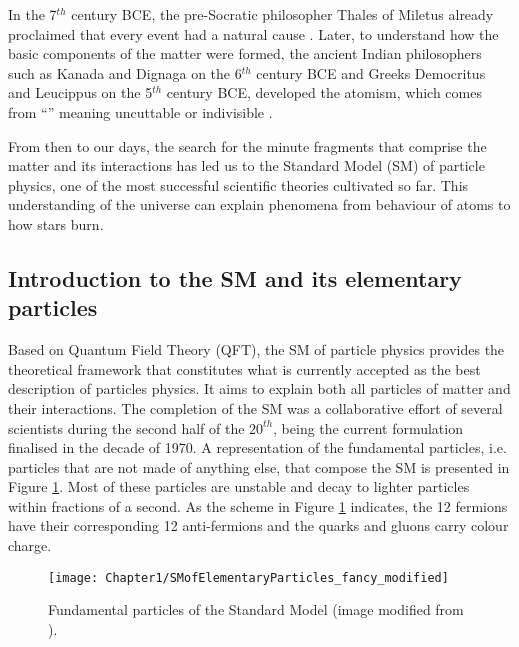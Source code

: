 In the 7$^{th}$ century BCE, the pre-Socratic philosopher Thales of Miletus already proclaimed that every 
event had a natural cause \cite{Singer_C}. Later, to understand how the basic components of the matter were
formed, the ancient Indian philosophers such as Kanada and Dignaga on the 6$^{th}$  century BCE
and Greeks Democritus and Leucippus on the 5$^{th}$  century BCE, developed the atomism,
which comes from ``\greekatom'' meaning uncuttable or indivisible
\cite{taylor2010atomists}\cite{leaman2002key}.




From then to our days, the search for the minute fragments that comprise the matter and its interactions has led us to the
Standard Model (SM) of particle physics, one of the most successful scientific theories cultivated so far. This understanding
of the universe can explain phenomena from behaviour of atoms to how stars burn. 



\subsection{Introduction to the SM and its elementary particles}
\label{sec:chap1:SM_and_EParticles}
Based on Quantum Field Theory (QFT), the SM of particle physics provides the theoretical framework that constitutes what is 
currently accepted as the best description of particles physics. It aims to explain both all particles of matter and
 their interactions. The completion of the SM was a collaborative effort of several scientists during the second half of the
$20^{th}$, being the current formulation finalised in the decade of 1970. A representation of the fundamental particles, i.e. particles that
are not made of anything else, that compose the SM is presented in Figure \ref{fig:Chap1:SM}.
Most of these particles are unstable and decay to lighter particles within fractions of a second. 
 As the scheme in Figure \ref{fig:Chap1:SM} indicates, the 
12 fermions have their corresponding 12 anti-fermions and the quarks and gluons carry colour charge. 
\begin{figure}
    \centering
    \texttt{[image: Chapter1/SMofElementaryParticles\_fancy\_modified]}
    \caption{Fundamental particles of the Standard Model (image modified from \cite{Purcell:1473657}). }
    \label{fig:Chap1:SM}
\end{figure}




